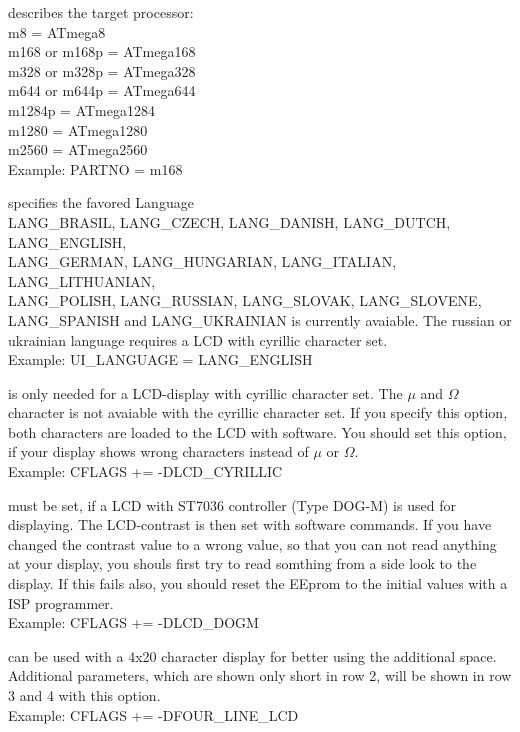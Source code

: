 \begin{description} \setlength{\itemsep}{0em}
  \item[PARTNO] describes the target processor:\\
         m8 = ATmega8\\
         m168 or m168p = ATmega168\\
         m328 or m328p = ATmega328\\
         m644 or m644p = ATmega644\\
         m1284p        = ATmega1284\\
         m1280         = ATmega1280\\
         m2560         = ATmega2560\\
    Example:  PARTNO = m168
   \item[UI\_LANGUAGE] specifies the favored Language\\
    LANG\_BRASIL, LANG\_CZECH, LANG\_DANISH, LANG\_DUTCH, LANG\_ENGLISH, \\
    LANG\_GERMAN, LANG\_HUNGARIAN, LANG\_ITALIAN, LANG\_LITHUANIAN, \\
    LANG\_POLISH, LANG\_RUSSIAN, LANG\_SLOVAK, LANG\_SLOVENE, \\
    LANG\_SPANISH  and LANG\_UKRAINIAN is currently avaiable.
 The russian or ukrainian language requires a LCD with cyrillic character set.\\
    Example:  UI\_LANGUAGE = LANG\_ENGLISH

  \item[LCD\_CYRILLIC] is only needed for a LCD-display with cyrillic character set. The \(\mu\) and \(\Omega\) character
is not avaiable with the cyrillic character set.
If you specify this option, both characters are loaded to the LCD with software.
You should set this option, if your display shows wrong characters instead of \(\mu\) or \(\Omega\).\\
Example: CFLAGS += -DLCD\_CYRILLIC

 \item[LCD\_DOGM] must be set, if a LCD with ST7036 controller (Type DOG-M) is used for displaying.
The LCD-contrast is then set with software commands.
If you have changed the contrast value to a wrong value, so that you can not read anything at your display,
you shouls first try to read somthing from a side look to the display.
If this fails also, you should reset the EEprom to the initial values with a ISP programmer.\\
Example: CFLAGS += -DLCD\_DOGM

 \item[FOUR\_LINE\_LCD] can be used with a 4x20 character display for better using the additional space.
Additional parameters, which are shown only short in row 2, will be shown in row 3 and 4 with this option.\\
Example: CFLAGS += -DFOUR\_LINE\_LCD


\end{description}

